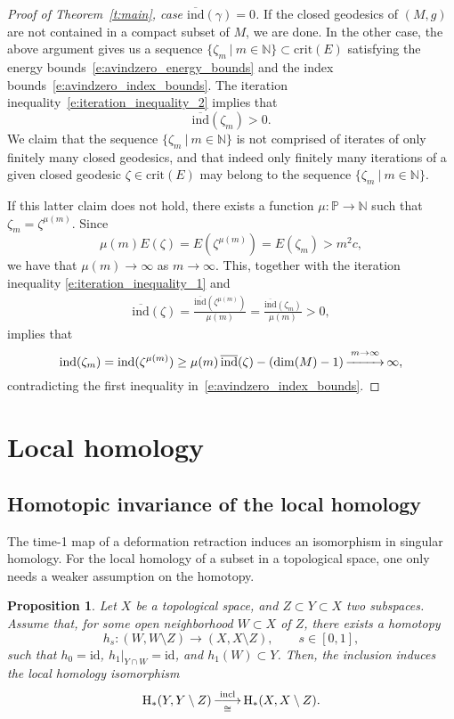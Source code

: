 \documentclass[reqno]{amsart}
\numberwithin{equation}{section}
\theoremstyle{personal}%
\newtheorem{prop}[thm]{Proposition}
\theoremstyle{definition}
\newcommand{\N}{\mathds{N}}
\newcommand{\PP}{\mathds{P}}
\newcommand{\incl}{\mathrm{incl}}
\newcommand{\crit}{\mathrm{crit}}
\newcommand{\Hom}{\mathrm{H}}
\newcommand{\avind}{\overline{\ind}}
\newcommand{\ind}{\mathrm{ind}}
\DeclareRobustCommand{\llongrightarrow}{\relbar\joinrel\relbar\joinrel\rightarrow}
\DeclareMathOperator*{\ttoup}{\llongrightarrow}
\DeclareMathOperator*{\tttoup}{\xrightarrow{\hspace*{25pt}}}
\begin{document}
\begin{proof}[Proof of Theorem~\ref{t:main}, case $\avind(\gamma)=0$]
If the closed geodesics of $(M,g)$ are not contained in a compact subset of $M$, we are done. In the other case, the above argument gives us a sequence $\{\zeta_m\ |\ m\in\N\}\subset\crit(E)$ satisfying the energy bounds~\eqref{e:avindzero_energy_bounds} and the index bounds~\eqref{e:avindzero_index_bounds}. The iteration inequality~\eqref{e:iteration_inequality_2} implies that \[\avind(\zeta_m)>0.\]
We claim that the sequence $\{\zeta_m\ |\ m\in\N\}$ is not comprised of  iterates of only finitely many closed geodesics, and that indeed only finitely many iterations of a given closed geodesic $\zeta\in\crit(E)$ may belong to the sequence $\{\zeta_m\ |\ m\in\N\}$. 

If this latter claim does not hold, there exists a function $\mu:\PP\to\N$ such that $\zeta_m=\zeta^{\mu(m)}$. Since 
\[ \mu(m)E(\zeta)= E(\zeta^{\mu(m)})= E(\zeta_m)> m^2 c, \]
we have that $\mu(m)\to\infty$ as $m\to\infty$. This, together with the iteration inequality \eqref{e:iteration_inequality_1} and
\begin{align*}
\avind(\zeta)=\frac{\avind(\zeta^{\mu(m)})}{\mu(m)}=\frac{\avind(\zeta_m)}{\mu(m)}>0,
\end{align*}
implies that 
\[\ind(\zeta_m)=\ind(\zeta^{\mu(m)})\geq \mu(m)\,\avind(\zeta)-(\dim(M)-1)\tttoup^{m\to\infty}\infty,\] 
contradicting the first inequality in~\eqref{e:avindzero_index_bounds}.
\end{proof}
\appendix

\section{Local homology}

\subsection{Homotopic invariance of the local homology}

The time-1 map of a deformation retraction induces an isomorphism in singular homology. For the local homology of a subset in a topological space, one only needs a weaker assumption on the homotopy.

\begin{prop}\label{p:homotopic_invariance_local_homology}
Let $X$ be a topological space, and $Z\subset Y\subset X$ two subspaces. Assume that, for some open neighborhood $W\subset X$ of $Z$, there exists a homotopy 
\[h_s:(W,W\setminus Z)\to (X,X\setminus Z),\qquad s\in[0,1],\] 
such that $h_0=\mathrm{id}$, $h_1|_{Y\cap W}=\mathrm{id}$, and $h_1(W)\subset Y$. Then, the inclusion induces the local homology isomorphism
\begin{align*}
\Hom_*(Y,Y\setminus Z) \ttoup^{\incl}_{\cong} \Hom_*(X,X\setminus Z).
\end{align*}
\end{prop}
\end{document}
